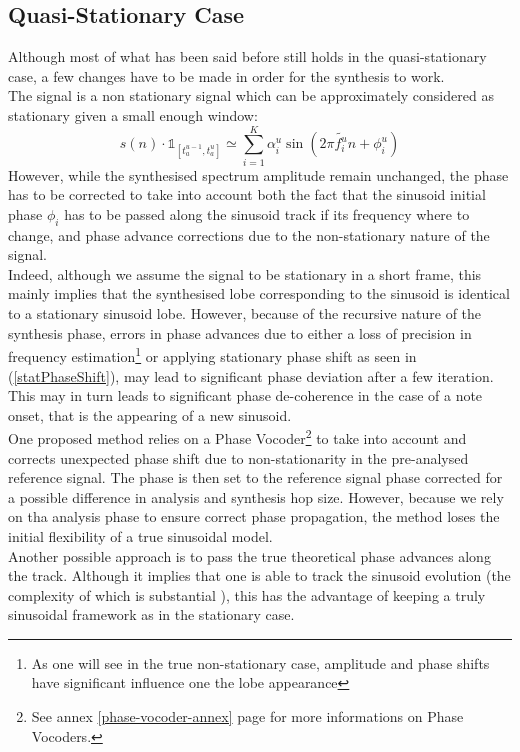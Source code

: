 \documentclass[]{article}
\begin{document}
\subsection{Quasi-Stationary Case}\label{quasi-stationary-case}
Although most of what has been said before still holds in the quasi-stationary case, a few changes have to be made in order for the synthesis to work.\\
The signal is a non stationary signal which can be approximately considered as stationary given a small enough window:
\begin{equation}
s(n)\cdot \mathds{1}_{[t_a^{u-1}, t_a^u]} \simeq \sum_{i=1}^{K}\alpha_i^{u} \sin(2\pi \tilde{f_i^{u}} n + \phi_{i}^u)
\end{equation}
However, while the synthesised spectrum amplitude remain unchanged, the phase has to be corrected to take into account both the fact that the sinusoid initial phase $\phi_i$ has to be passed along the sinusoid track if its frequency where to change, and phase advance corrections due to the non-stationary nature of the signal. \\
Indeed, although we assume the signal to be stationary in a short frame, this mainly implies that the synthesised lobe corresponding to the sinusoid is identical to a stationary sinusoid lobe. However, because of the recursive nature of the synthesis phase, errors in phase advances due to either a loss of precision in frequency estimation\footnote{As one will see in the true non-stationary case, amplitude and phase shifts have significant influence one the lobe appearance} or applying stationary phase shift as seen in (\ref{statPhaseShift}), may lead to significant phase deviation after a few iteration. This may in turn leads to significant phase de-coherence in the case of a note onset, that is the appearing of a new sinusoid.\\
One proposed method relies on a Phase Vocoder\footnote{See annex \ref{phase-vocoder-annex} page \pageref{phase-vocoder-annex} for more informations on Phase Vocoders.} to take into account and corrects unexpected phase shift due to non-stationarity in the pre-analysed reference signal. The phase is then set to the reference signal phase corrected for a possible difference in analysis and synthesis hop size. However, because we rely on tha analysis phase to ensure correct phase propagation, the method loses the initial flexibility of a true sinusoidal model.\\
Another possible approach is to pass the true theoretical phase advances along the track. Although it implies that one is able to track the sinusoid evolution (the complexity of which is substantial \cite{mcaulay1986speech, serra1989system, karrer2006phavorit}), this has the advantage of keeping a truly sinusoidal framework as in the stationary case.\\
\end{document}
